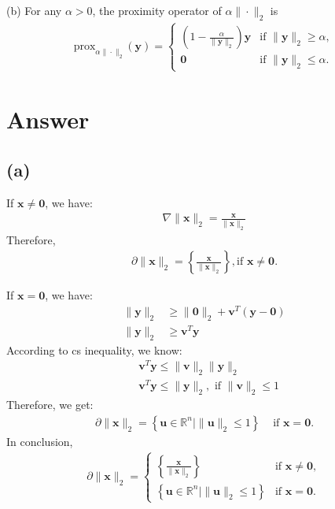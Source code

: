 \documentclass{article}
\newcommand{\R}{\mathbb{R}}
\begin{document}
\noindent
(b) For any \(\alpha > 0\), the proximity operator of \(\alpha \|\cdot\|_2\) is
\begin{align*}
    \text{prox}_{\alpha \|\cdot\|_2}(\bm{y}) = \begin{cases}
        \left(1 - \frac{\alpha}{\|\bm{y}\|_2} \right)\bm{y} &\text{if }\|\bm{y}\|_2 \geq \alpha, \\
        \bm{0} &\text{if } \|\bm{y}\|_2 \leq \alpha.
    \end{cases}
\end{align*}

\section*{Answer}
\subsection*{(a)}
If \(\bm{x} \ne \bm{0}\), we have:
\begin{align*}
    \nabla \|\bm{x}\|_2 = \frac{\bm{x}}{\|\bm{x}\|_2}
\end{align*}
Therefore,
\begin{align*}
    \partial \|\bm{x}\|_2 = \left\{ \frac{\bm{x}}{\|\bm{x}\|_2} \right\}, \text{if } \bm{x} \ne \bm{0}.
\end{align*}

If \(\bm{x} = \bm{0}\), we have:
\begin{align*}
    \|\bm{y}\|_2 &\geq \|\bm{0}\|_2 + \bm{v}^T (\bm{y} - \bm{0}) \\
    \|\bm{y}\|_2 &\geq \bm{v}^T \bm{y}
\end{align*}
According to cs inequality, we know:
\begin{align*}
    &\bm{v}^T \bm{y} \leq \|\bm{v}\|_2\|\bm{y}\|_2 \\
    &\bm{v}^T \bm{y} \leq \|\bm{y}\|_2, \text{  if  } \|\bm{v}\|_2 \leq 1
\end{align*}
Therefore, we get:
\begin{align*}
    \partial \|\bm{x}\|_2 = \left\{ \bm{u} \in \R^n | \|\bm{u}\|_2 \leq 1\right\} &\text{  if  } \bm{x} = \bm{0}.
\end{align*}
In conclusion,
\begin{align*}
    \partial \|\bm{x}\|_2 = \begin{cases}
        \left\{ \frac{\bm{x}}{\|\bm{x}\|_2}\right\} &\text{if } \bm{x} \ne \bm{0}, \\
        \left\{ \bm{u} \in \R^n | \|\bm{u}\|_2 \leq 1\right\} &\text{if } \bm{x} = \bm{0}.
    \end{cases}
\end{align*}
\end{document}

